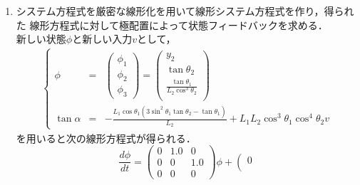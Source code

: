 \begin{enumerate}
\begin{equation}
\begin{array}{ccc}
     0 & -\frac{1}{1.2} & 0 
   \end{array} \right) \left(\begin{array}{c}
     y_2 \\
     \theta_1 \\
     \theta_2
   \end{array} \right) + \left(\begin{array}{c}
     0 \\
     -\frac{1}{0.4} \\
     0
   \end{array} \right) \tan \alpha
\end{equation}
      LQ 制御と極配置によって，この線形システムの状態フィードバックを求
      めることができる．
%
 \item
      システム方程式を厳密な線形化を用いて線形システム方程式を作り，得られた
      線形方程式に対して極配置によって状態フィードバックを求める．\\
      新しい状態$\phi$と新しい入力$v$として，
\begin{eqnarray*}
 \left\{
  \begin{array}{rcl}
   \phi &=& \left(
	     \begin{array}{c}
	      \phi_1 \\
	      \phi_2 \\
	      \phi_3
	     \end{array}
	    \right) = 
   \left(
    \begin{array}{c}
     y_2 \\
     \tan \theta_2 \\
     \frac{\tan \theta_1}{L_2 \cos ^3 \theta_2} \\
    \end{array}
   \right) \\
   \tan \alpha &=& \displaystyle
    -\frac{L_1 \cos \theta_1(3\sin ^2 \theta_1 \tan \theta_2 - \tan \theta_1)}
    {L_2} + L_1L_2 \cos ^3 \theta_1 \cos ^4 \theta_2 v
  \end{array}\right.
\end{eqnarray*}
を用いると次の線形方程式が得られる．
\begin{equation}
 \frac{d \phi}{dt} = \left(\begin{array}{ccc}
     0 & 1.0 & 0 \\
     0 & 0 & 1.0 \\
     0 & 0 & 0
   \end{array} \right) \phi + \left(\begin{array}{c}
     0 \\

\end{array}
\end{equation}
\end{enumerate}
